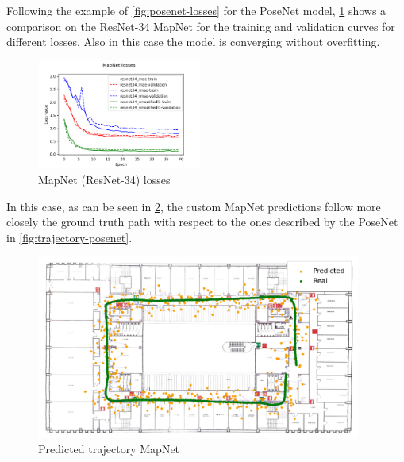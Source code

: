Following the example of \cref{fig:posenet-losses} for the PoseNet model, \cref{fig:mapnet-losses} shows a comparison on the ResNet-34 MapNet for the training and validation curves for different losses. Also in this case the model is converging without overfitting.
\begin{figure}[htbp]
    \begin{center}
        \includegraphics[width=0.48\textwidth]{./imgs/mapnet_losses.png}
    \end{center}
    \caption{MapNet (ResNet-34) losses}
    \label{fig:mapnet-losses}
\end{figure}

In this case, as can be seen in \cref{fig:trajectory-mapnet}, the custom MapNet predictions follow more closely the ground truth path with respect to the ones described by the PoseNet in \cref{fig:trajectory-posenet}.
\begin{figure}[htbp]
    \begin{center}
        \includegraphics[width=0.95\textwidth]{./imgs/mapnet_map.png}
    \end{center}
    \caption{Predicted trajectory MapNet}
    \label{fig:trajectory-mapnet}
\end{figure}

